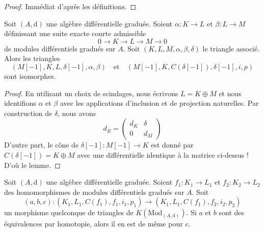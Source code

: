 \begin{proof}
Immédiat d'après les définitions.
\end{proof}

\begin{lemma}
\label{lemma-rotate-triangle}
Soit $(A, \text{d})$ une algèbre différentielle graduée. Soient $\alpha : K \to L$
et $\beta : L \to M$ définissant une suite exacte courte admissible
$$
0 \to K \to L \to M \to 0
$$
de modules différentiels gradués sur $A$. Soit $(K, L, M, \alpha, \beta, \delta)$ le
triangle associé. Alors les triangles
$$
(M[-1], K, L, \delta[-1], \alpha, \beta)
\quad\text{et}\quad
(M[-1], K, C(\delta[-1]), \delta[-1], i, p)
$$
sont isomorphes.
\end{lemma}

\begin{proof}
En utilisant un choix de scindages, nous écrivons $L = K \oplus M$ et nous
identifions $\alpha$ et $\beta$ avec les applications d'inclusion et de projection
naturelles. Par construction de $\delta$, nous avons
$$
d_B =
\left(
\begin{matrix}
d_K & \delta \\
0 & d_M
\end{matrix}
\right)
$$
D'autre part, le cône de $\delta[-1] : M[-1] \to K$ est donné par $C(\delta[-1]) =
K \oplus M$ avec une différentielle identique à la matrice ci-dessus ! D'où le lemme.
\end{proof}

\begin{lemma}
\label{lemma-third-isomorphism}
Soit $(A, \text{d})$ une algèbre différentielle graduée. Soient $f_1 : K_1 \to
L_1$ et $f_2 : K_2 \to L_2$ des homomorphismes de modules différentiels gradués
sur $A$. Soit
$$
(a, b, c) :
(K_1, L_1, C(f_1), f_1, i_1, p_1)
\longrightarrow
(K_1, L_1, C(f_1), f_2, i_2, p_2)
$$
un morphisme quelconque de triangles de $K(\text{Mod}_{(A, \text{d})})$. Si $a$ et
$b$ sont des équivalences par homotopie, alors il en est de même pour $c$.
\end{lemma}

